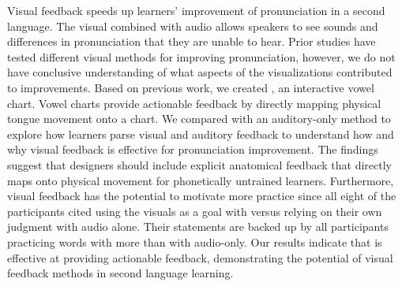 Visual feedback speeds up learners' improvement of pronunciation in a second language. The visual combined with audio allows speakers to see sounds and differences in pronunciation that they are unable to hear. Prior studies have tested different visual methods for improving pronunciation, however, we do not have conclusive understanding of what aspects of the visualizations contributed to improvements. Based on previous work, we created \visowel{}, an interactive vowel chart. Vowel charts provide actionable feedback by directly mapping physical tongue movement onto a chart. We compared \visowel{} with an auditory-only method to explore how learners parse visual and auditory feedback to understand how and why visual feedback is effective for pronunciation improvement. The findings suggest that designers should include explicit anatomical feedback that directly maps onto physical movement for phonetically untrained learners. Furthermore, visual feedback has the potential to motivate more practice since all eight of the participants cited using the visuals as a goal with \visowel{} versus relying on their own judgment with audio alone. Their statements are backed up by all participants practicing words with \visowel{} more than with audio-only. Our results indicate that \visowel{} is effective at providing actionable feedback, demonstrating the potential of visual feedback methods in second language learning.